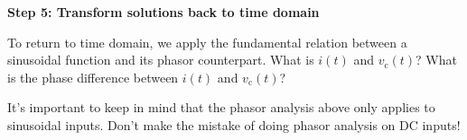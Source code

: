 \begin{enumerate}


\qitem \textbf{Step 5: Transform solutions back to time domain}

To return to time domain, we apply the fundamental relation between a sinusoidal function and its phasor counterpart.
What is $i(t)$ and $v_{\text{c}}(t)$? What is the phase difference between $i(t)$ and $v_{\text{c}}(t)$? 



\end{enumerate}

It's important to keep in mind that the phasor analysis above only applies to
sinusoidal inputs. Don't make the mistake of doing phasor analysis on DC inputs!